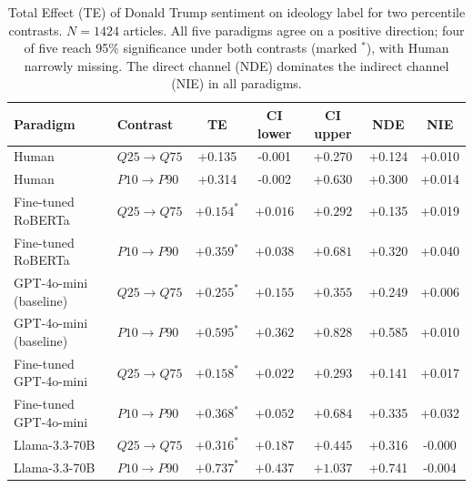 \begin{table}[ht]
  \centering
  \begin{tabular}{llS[table-format=+1.3]S[table-format=+1.3]S[table-format=+1.3]S[table-format=+1.3]S[table-format=+1.3]}
    \toprule
    \textbf{Paradigm} & \textbf{Contrast} &
      {\textbf{TE}} &
      {\textbf{CI lower}} & {\textbf{CI upper}} &
      {\textbf{NDE}} & {\textbf{NIE}} \\
    \midrule
    Human
      & $Q25 \to Q75$  & +0.135 & -0.001 & +0.270 & +0.124 & +0.010 \\
    Human
      & $P10 \to P90$  & +0.314 & -0.002 & +0.630 & +0.300 & +0.014 \\
    \addlinespace
    Fine-tuned RoBERTa
      & $Q25 \to Q75$  & {$\mathbf{+0.154^{*}}$} & {$\mathbf{+0.016}$} & {$\mathbf{+0.292}$} & +0.135 & +0.019 \\
    Fine-tuned RoBERTa
      & $P10 \to P90$  & {$\mathbf{+0.359^{*}}$} & {$\mathbf{+0.038}$} & {$\mathbf{+0.681}$} & +0.320 & +0.040 \\
    \addlinespace
    GPT-4o-mini (baseline)
      & $Q25 \to Q75$  & {$\mathbf{+0.255^{*}}$} & {$\mathbf{+0.155}$} & {$\mathbf{+0.355}$} & +0.249 & +0.006 \\
    GPT-4o-mini (baseline)
      & $P10 \to P90$  & {$\mathbf{+0.595^{*}}$} & {$\mathbf{+0.362}$} & {$\mathbf{+0.828}$} & +0.585 & +0.010 \\
    \addlinespace
    Fine-tuned GPT-4o-mini
      & $Q25 \to Q75$  & {$\mathbf{+0.158^{*}}$} & {$\mathbf{+0.022}$} & {$\mathbf{+0.293}$} & +0.141 & +0.017 \\
    Fine-tuned GPT-4o-mini
      & $P10 \to P90$  & {$\mathbf{+0.368^{*}}$} & {$\mathbf{+0.052}$} & {$\mathbf{+0.684}$} & +0.335 & +0.032 \\
    \addlinespace
    Llama-3.3-70B
      & $Q25 \to Q75$  & {$\mathbf{+0.316^{*}}$} & {$\mathbf{+0.187}$} & {$\mathbf{+0.445}$} & +0.316 & -0.000 \\
    Llama-3.3-70B
      & $P10 \to P90$  & {$\mathbf{+0.737^{*}}$} & {$\mathbf{+0.437}$} & {$\mathbf{+1.037}$} & +0.741 & -0.004 \\
    \bottomrule
  \end{tabular}
  \caption{Total Effect (TE) of Donald Trump sentiment on ideology label for
    two percentile contrasts. $N = \num{1424}$ articles. All five paradigms agree on a
    positive direction; four of five reach 95\%
    significance under both contrasts (marked $^*$), with Human narrowly missing. The direct channel (NDE) dominates the indirect channel (NIE) in all paradigms.}
  \label{tab:te-trump}
\end{table}


